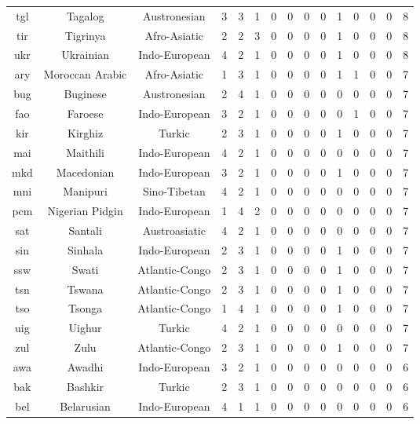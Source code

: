 \begin{longtable}{ccc|ccccccccccc|c}
    tgl & Tagalog & Austronesian & 3 & 3 & 1 & 0 & 0 & 0 & 0 & 1 & 0 & 0 & 0 & 8 \\ 
    tir & Tigrinya & Afro-Asiatic & 2 & 2 & 3 & 0 & 0 & 0 & 0 & 1 & 0 & 0 & 0 & 8 \\ 
    ukr & Ukrainian & Indo-European & 4 & 2 & 1 & 0 & 0 & 0 & 0 & 1 & 0 & 0 & 0 & 8 \\ 
    ary & Moroccan Arabic & Afro-Asiatic & 1 & 3 & 1 & 0 & 0 & 0 & 0 & 1 & 1 & 0 & 0 & 7 \\ 
    bug & Buginese & Austronesian & 2 & 4 & 1 & 0 & 0 & 0 & 0 & 0 & 0 & 0 & 0 & 7 \\ 
    fao & Faroese & Indo-European & 3 & 2 & 1 & 0 & 0 & 0 & 0 & 0 & 1 & 0 & 0 & 7 \\ 
    kir & Kirghiz & Turkic & 2 & 3 & 1 & 0 & 0 & 0 & 0 & 1 & 0 & 0 & 0 & 7 \\ 
    mai & Maithili & Indo-European & 4 & 2 & 1 & 0 & 0 & 0 & 0 & 0 & 0 & 0 & 0 & 7 \\ 
    mkd & Macedonian & Indo-European & 3 & 2 & 1 & 0 & 0 & 0 & 0 & 1 & 0 & 0 & 0 & 7 \\ 
    mni & Manipuri & Sino-Tibetan & 4 & 2 & 1 & 0 & 0 & 0 & 0 & 0 & 0 & 0 & 0 & 7 \\ 
    pcm & Nigerian Pidgin & Indo-European & 1 & 4 & 2 & 0 & 0 & 0 & 0 & 0 & 0 & 0 & 0 & 7 \\ 
    sat & Santali & Austroasiatic & 4 & 2 & 1 & 0 & 0 & 0 & 0 & 0 & 0 & 0 & 0 & 7 \\ 
    sin & Sinhala & Indo-European & 2 & 3 & 1 & 0 & 0 & 0 & 0 & 1 & 0 & 0 & 0 & 7 \\ 
    ssw & Swati & Atlantic-Congo & 2 & 3 & 1 & 0 & 0 & 0 & 0 & 1 & 0 & 0 & 0 & 7 \\ 
    tsn & Tswana & Atlantic-Congo & 2 & 3 & 1 & 0 & 0 & 0 & 0 & 1 & 0 & 0 & 0 & 7 \\ 
    tso & Tsonga & Atlantic-Congo & 1 & 4 & 1 & 0 & 0 & 0 & 0 & 1 & 0 & 0 & 0 & 7 \\ 
    uig & Uighur & Turkic & 4 & 2 & 1 & 0 & 0 & 0 & 0 & 0 & 0 & 0 & 0 & 7 \\ 
    zul & Zulu & Atlantic-Congo & 2 & 3 & 1 & 0 & 0 & 0 & 0 & 1 & 0 & 0 & 0 & 7 \\ 
    awa & Awadhi & Indo-European & 3 & 2 & 1 & 0 & 0 & 0 & 0 & 0 & 0 & 0 & 0 & 6 \\ 
    bak & Bashkir & Turkic & 2 & 3 & 1 & 0 & 0 & 0 & 0 & 0 & 0 & 0 & 0 & 6 \\ 
    bel & Belarusian & Indo-European & 4 & 1 & 1 & 0 & 0 & 0 & 0 & 0 & 0 & 0 & 0 & 6 \\ 

\end{longtable}
